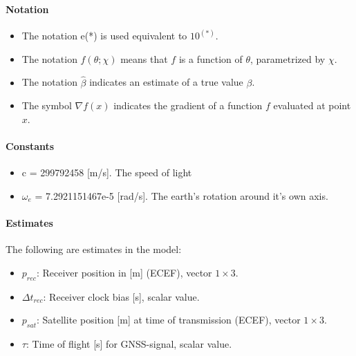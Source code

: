 \documentclass[]{article}
\begin{document}
\paragraph{Notation}
\begin{itemize}
\item The notation e(*) is used equivalent to $10^{(*)}$.
\item The notation $f(\theta;\chi)$ means that $f$ is a function of $\theta$, parametrized by $\chi$.
\item The notation $\hat{\beta}$ indicates an estimate of a true value $\beta$.
\item The symbol $\nabla f(x)$ indicates the gradient of a function $f$ evaluated at point $x$. 
\end{itemize}
\paragraph{Constants}
\begin{itemize}
\item c = 299792458 [m/s]. The speed of light
\item $\omega_e$ = 7.2921151467e-5 [rad/s]. The earth's rotation around it's own axis.
\begin{comment}
\item 	F = -4.442807633e-10. Satellite clock bias constant (unknown)
\item	$\mu$ = 3.986005e14
\end{comment}
\end{itemize}

\paragraph{Estimates}
The following are estimates in the model:
\begin{itemize}
\item $p_{rec}$: Receiver position in [m] (ECEF), vector $1\times 3$.
\item $\Delta t_{rec}$: Receiver clock bias [s], scalar value.
\item $p_{sat}$: Satellite position [m] at time of transmission (ECEF), vector $1\times 3$.
\item $\tau$: Time of flight [s] for GNSS-signal, scalar value.
\end{itemize}
\end{document}
